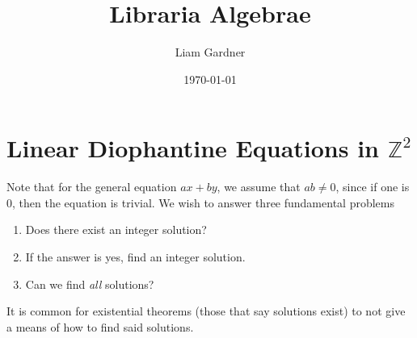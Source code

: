 \documentclass[oneside]{book}
\title{Libraria Algebrae}
\author{Liam Gardner}
\date{\today}
\newcommand\tab[1][1cm]{\hspace*{#1}}
\begin{document}
\DeclarePairedDelimiter\abs{\lvert}{\rvert}

\maketitle
\tableofcontents
\chapter{Linear Diophantine Equations in $\mathbb{Z}^2$}
\tab
Note that for the general equation $ax+by$, we assume that $ab\neq0$, since if one is 0, then the equation is trivial. We wish to answer three fundamental problems
\begin{enumerate}
\item Does there exist an integer solution?
\item If the answer is yes, find an integer solution.
\item Can we find \textit{all} solutions?
\end{enumerate}
\tab
It is common for existential theorems (those that say solutions exist) to not give a means of how to find said solutions.
\end{document}

